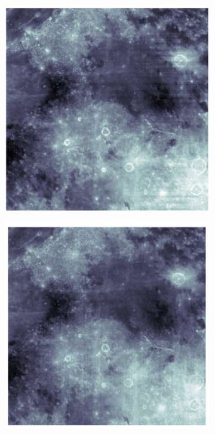   \begin{figure}[ht]
    \centering
    \begin{subfigure}{0.5\textwidth}
    \centering
        \includegraphics[scale = 0.25]{pics/sep_mask_rec}
    \end{subfigure}%
    \begin{subfigure}{0.5\textwidth}
    \hspace{4cm}    
    \centering
        \includegraphics[scale= 0.25]{pics/sep_mask_rec_diff}

\end{subfigure}
\end{figure}
